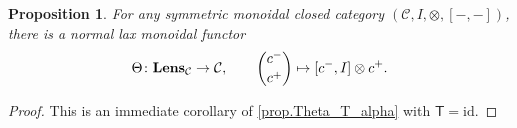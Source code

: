 \documentclass[11pt, oneside, article]{memoir}
\theoremstyle{definition}
\theoremstyle{plain}
\newtheorem{proposition}[proposition]{Proposition}
\DeclarePairedDelimiter{\ihom}{[}{]}
\newcommand{\cat}[1]{\mathcal{#1}}%
\newcommand{\Cat}[1]{\mathbf{#1}}%
\newcommand{\fun}[1]{\mathrm{#1}}%
\newcommand{\Fun}[1]{\mathsf{#1}}%
\newcommand{\id}{\mathrm{id}}
\newcommand{\ev}{\fun{ev}}
\newcommand{\coev}{\fun{coev}}
\newcommand{\Lens}[1]{\Cat{Lens}_{#1}}
\newcommand{\inpt}[1]{#1^{-}}
\newcommand{\outp}[1]{#1^{+}}
\newcommand{\lensob}[1]{\binom{\inpt{#1}}{\outp{#1}}}%
\begin{document}
\begin{proposition}\label{prop.Theta}
For any symmetric monoidal closed category $(\cat{C},I,\otimes, [-,-])$, there is a normal lax monoidal functor
\[\Theta\colon\Lens{\cat{C}}\to\cat{C},\qquad
\lensob{c}\mapsto\ihom{\inpt c,I}\otimes\outp c.\]
\end{proposition}
\begin{proof}
This is an immediate corollary of \cref{prop.Theta_T_alpha} with $\Fun{T}=\id$. 

\end{proof}
\end{document}
